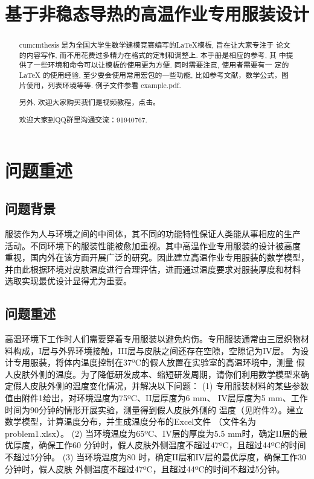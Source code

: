 \documentclass{cumcmthesis}
\title{基于非稳态导热的高温作业专用服装设计}
\begin{document}
 \maketitle
 \begin{abstract}
cumcmthesis 是为全国大学生数学建模竞赛编写的\LaTeX{}模板, 旨在让大家专注于 论文的内容写作, 而不用花费过多精力在格式的定制和调整上. 本手册是相应的参考, 其 中提供了一些环境和命令可以让模板的使用更为方便. 同时需要注意, 使用者需要有一 定的 \LaTeX{} 的使用经验, 至少要会使用常用宏包的一些功能, 比如参考文献，数学公式，图片使用，列表环境等等. 例子文件参看 example.pdf.

另外, 欢迎大家购买我们是视频教程，点击\href{https://item.taobao.com/item.htm?spm=a1z10.1-c.w4004-3473795048.4.ThFQCG&id=43823508044}{}。

欢迎大家到QQ群里沟通交流：91940767.

\end{abstract}

\tableofcontents

\section{问题重述}

    \subsection{问题背景}
    服装作为人与环境之间的中间体，其不同的功能特性保证人类能从事相应的生产
    活动。不同环境下的服装性能被愈加重视。其中高温作业专用服装的设计被高度
    重视，国内外在该方面开展广泛的研究。因此建立高温作业专用服装的数学模型，
    并由此根据环境对皮肤温度进行合理评估，进而通过温度要求对服装厚度和材料
    选取实现最优设计显得尤为重要。

    \subsection{问题重述}
      高温环境下工作时人们需要穿着专用服装以避免灼伤。专用服装通常由三层织物材
    料构成，I层与外界环境接触，III层与皮肤之间还存在空隙，空隙记为IV层。
      为设计专用服装，将体内温度控制在37ºC的假人放置在实验室的高温环境中，测量
    假人皮肤外侧的温度。为了降低研发成本、缩短研发周期，请你们利用数学模型来确
    定假人皮肤外侧的温度变化情况，并解决以下问题：
    (1) 专用服装材料的某些参数值由附件1给出，对环境温度为75ºC、II层厚度为6 mm、
        IV层厚度为5 mm、工作时间为90分钟的情形开展实验，测量得到假人皮肤外侧的
        温度（见附件2）。建立数学模型，计算温度分布，并生成温度分布的Excel文件
        （文件名为problem1.xlsx）。
    (2) 当环境温度为65ºC、IV层的厚度为5.5 mm时，确定II层的最优厚度，确保工作60
        分钟时，假人皮肤外侧温度不超过47ºC，且超过44ºC的时间不超过5分钟。
    (3) 当环境温度为80 时，确定II层和IV层的最优厚度，确保工作30分钟时，假人皮肤
        外侧温度不超过47ºC，且超过44ºC的时间不超过5分钟。
\end{document}
